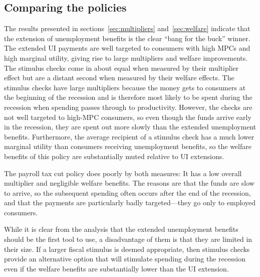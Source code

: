 \documentclass[\econtexRoot/HAFiscal]{subfiles}
\begin{document}
\subsection{Comparing the policies} 

The results presented in sections~\ref{sec:multipliers} and~\ref{sec:welfare} indicate that the extension of unemployment benefits is the clear ``bang for the buck'' winner. The extended UI payments are well targeted to consumers with high MPCs and high marginal utility, giving rise to large multipliers and welfare improvements. The stimulus checks come in about equal when measured by their multiplier effect but are a distant second when measured by their welfare effects. The stimulus checks have large multipliers because the money gets to consumers at the beginning of the recession and is therefore most likely to be spent during the recession when spending passes through to productivity.  However, the checks are not well targeted to high-MPC consumers, so even though the funds arrive early in the recession, they are spent out more slowly than the extended unemployment benefits. Furthermore, the average recipient of a stimulus check has a much lower marginal utility than consumers receiving unemployment benefits, so the welfare benefits of this policy are substantially muted relative to UI extensions.

The payroll tax cut policy does poorly by both measures: It has a low overall multiplier and negligible welfare benefits. The reasons are that the funds are slow to arrive, so the subsequent spending often occurs after the end of the recession, and that the payments are particularly badly targeted---they go only to employed consumers.

While it is clear from the analysis that the extended unemployment benefits should be the first tool to use, a disadvantage of them is that they are limited in their size. If a larger fiscal stimulus is deemed appropriate, then stimulus checks provide an alternative option that will stimulate spending during the recession even if the welfare benefits are substantially lower than the UI extension.
\end{document}
